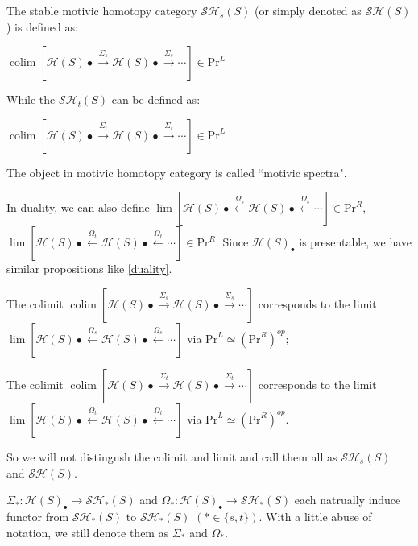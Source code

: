 \begin{definition}\label{shs}
    The stable motivic homotopy category $\mathcal{SH}_s(S)$ (or simply denoted as $\mathcal{SH}(S)$) is defined as:

$    \operatorname{colim}[\mathcal{H}(S)\bullet \xrightarrow{\Sigma_s} \mathcal{H}(S)\bullet \xrightarrow{\Sigma_s} \cdots]\in \text{Pr}^L$

While the $\mathcal{SH}_t(S)$ can be defined as:

$    \operatorname{colim}[\mathcal{H}(S)\bullet \xrightarrow{\Sigma_t} \mathcal{H}(S)\bullet \xrightarrow{\Sigma_t} \cdots]\in \text{Pr}^L$

The object in motivic homotopy category is called ``motivic spectra".

\end{definition}

In duality, we can also define $    \operatorname{lim}[\mathcal{H}(S)\bullet \xleftarrow{\Omega_s} \mathcal{H}(S)\bullet \xleftarrow{\Omega_s} \cdots]\in \text{Pr}^R$, $    \operatorname{lim}[\mathcal{H}(S)\bullet \xleftarrow{\Omega_t} \mathcal{H}(S)\bullet \xleftarrow{\Omega_t} \cdots]\in \text{Pr}^R$. Since $\mathcal{H}(S)_\bullet$ is presentable, we have similar propositions like \ref{duality}.

\begin{proposition}

    The colimit $    \operatorname{colim}[\mathcal{H}(S)\bullet \xrightarrow{\Sigma_s} \mathcal{H}(S)\bullet \xrightarrow{\Sigma_s} \cdots]$ corresponds to the limit $\operatorname{lim}[\mathcal{H}(S)\bullet \xleftarrow{\Omega_s} \mathcal{H}(S)\bullet \xleftarrow{\Omega_s} \cdots]$ via $\text{Pr}^L\simeq (\text{Pr}^R)^{op}$;

    The colimit $    \operatorname{colim}[\mathcal{H}(S)\bullet \xrightarrow{\Sigma_t} \mathcal{H}(S)\bullet \xrightarrow{\Sigma_t} \cdots]$ corresponds to the limit $\operatorname{lim}[\mathcal{H}(S)\bullet \xleftarrow{\Omega_t} \mathcal{H}(S)\bullet \xleftarrow{\Omega_t} \cdots]$ via $\text{Pr}^L\simeq (\text{Pr}^R)^{op}$.
\end{proposition}

So we will not distingush the colimit and limit and call them all as $\mathcal{SH}_s(S)$ and $\mathcal{SH}(S)$.

\begin{remark}
    $\Sigma_{*}:\mathcal{H}(S)_\bullet\to \mathcal{SH}_{*}(S)$ and $\Omega_{*}:\mathcal{H}(S)_\bullet\to \mathcal{SH}_{*}(S)$ each natrually induce functor from $\mathcal{SH}_{*}(S)$ to $\mathcal{SH}_{*}(S)$ $(*\in \{s,t\})$. With a little abuse of notation, we still denote them as $\Sigma_{*} $ and $\Omega_{*}$.
\end{remark}



